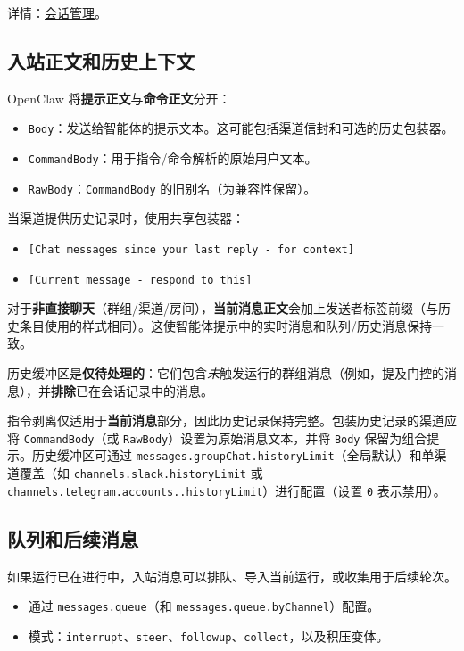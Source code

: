 详情：\href{/concepts/session}{会话管理}。

\subsection{入站正文和历史上下文}


OpenClaw 将\textbf{提示正文}与\textbf{命令正文}分开：

\begin{itemize}
  \item \texttt{Body}：发送给智能体的提示文本。这可能包括渠道信封和可选的历史包装器。
  \item \texttt{CommandBody}：用于指令/命令解析的原始用户文本。
  \item \texttt{RawBody}：\texttt{CommandBody} 的旧别名（为兼容性保留）。
\end{itemize}


当渠道提供历史记录时，使用共享包装器：

\begin{itemize}
  \item \texttt{[Chat messages since your last reply - for context]}
  \item \texttt{[Current message - respond to this]}
\end{itemize}


对于\textbf{非直接聊天}（群组/渠道/房间），\textbf{当前消息正文}会加上发送者标签前缀（与历史条目使用的样式相同）。这使智能体提示中的实时消息和队列/历史消息保持一致。

历史缓冲区是\textbf{仅待处理的}：它们包含\textit{未}触发运行的群组消息（例如，提及门控的消息），并\textbf{排除}已在会话记录中的消息。

指令剥离仅适用于\textbf{当前消息}部分，因此历史记录保持完整。包装历史记录的渠道应将 \texttt{CommandBody}（或 \texttt{RawBody}）设置为原始消息文本，并将 \texttt{Body} 保留为组合提示。历史缓冲区可通过 \texttt{messages.groupChat.historyLimit}（全局默认）和单渠道覆盖（如 \texttt{channels.slack.historyLimit} 或 \texttt{channels.telegram.accounts..historyLimit}）进行配置（设置 \texttt{0} 表示禁用）。

\subsection{队列和后续消息}


如果运行已在进行中，入站消息可以排队、导入当前运行，或收集用于后续轮次。

\begin{itemize}
  \item 通过 \texttt{messages.queue}（和 \texttt{messages.queue.byChannel}）配置。
  \item 模式：\texttt{interrupt}、\texttt{steer}、\texttt{followup}、\texttt{collect}，以及积压变体。
\end{itemize}


